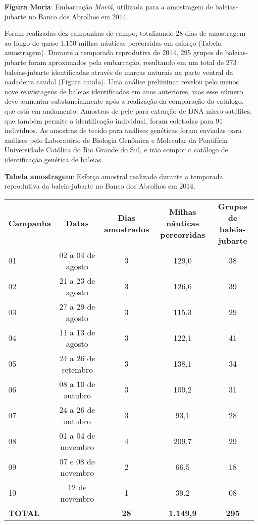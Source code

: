 \textbf{Figura Moria}: Embarcação \textit{Moriá}, utilizada para a amostragem de baleias-jubarte no Banco dos Abrolhos em 2014.

Foram realizadas dez campanhas de campo, totalizando 28 dias de amostragem ao longo de quase 1.150 milhas náuticas percorridas em esforço (Tabela amostragem). Durante a temporada reprodutiva de 2014, 295 grupos de baleias-jubarte foram aproximados pela embarcação, resultando em um total de 273 baleias-jubarte identificadas através de marcas naturais na parte ventral da nadadeira caudal (Figura cauda). Uma análise preliminar revelou pelo menos nove reavistagens de baleias identificadas em anos anteriores, mas esse número deve aumentar substancialmente após a realização da comparação do catálogo, que está em andamento. Amostras de pele para extração de DNA micro-satélites, que também permite a identificação individual, foram coletadas para 91 indivíduos. As amostras de tecido para análises genéticas foram enviadas para análises pelo Laboratório de Biologia Genômica e Molecular da Pontifícia Universidade Católica do Rio Grande do Sul, e irão compor o catálogo de identificação genética de baleias.

\textbf{Tabela amostragem}: Esforço amostral realizado durante a temporada reprodutiva da baleia-jubarte no Banco dos Abrolhos em 2014.  

\begin{tabular}{lcccc}  
\textbf{Campanha} & \textbf{Datas} & \textbf{Dias amostrados} & \textbf{Milhas náuticas percorridas} & \textbf{Grupos de baleia-jubarte} \\
01 & 02 a 04 de agosto & 3 & 129,0 & 38 \\
02 & 21 a 23 de agosto & 3 & 126,6 & 39 \\
03 & 27 a 29 de agosto & 3 & 115,3 & 29 \\
04 & 11 a 13 de agosto & 3 & 122,1 & 41 \\
05 & 24 a 26 de setembro & 3 & 138,1 & 34 \\
06 & 08 a 10 de outubro & 3 & 109,2 & 31 \\
07 & 24 a 26 de outubro & 3 & 93,1 & 28 \\
08 & 01 a 04 de novembro & 4 & 209,7 & 29 \\
09 & 07 e 08 de novembro & 2 & 66,5 & 18 \\
10 & 12 de novembro & 1 & 39,2 & 08 \\
\textbf{TOTAL} & & \textbf{28} & \textbf{1.149,9} & \textbf{295} \\
\end{tabular}    
